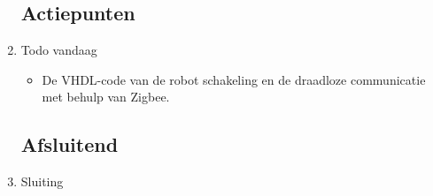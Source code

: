 \documentclass{article}
\begin{document}
\begin{enumerate}
\subsection*{Actiepunten}
	\item Todo vandaag
\begin{itemize}
	\item De VHDL-code van de robot schakeling en de draadloze communicatie met behulp van Zigbee. 
\end{itemize}

\noindent 
\subsection*{Afsluitend}
	\item Sluiting

\end{enumerate}
\end{document}
